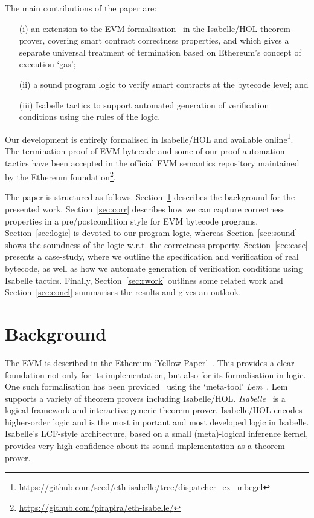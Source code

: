 \documentclass[sigplan,10pt,review]{acmart}\settopmatter{printfolios=true,printccs=false,printacmref=false}
\begin{document}
The main contributions of the paper are:
\begin{itemize}
\item[(i)] an extension to the EVM formalisation~\cite{Yoichi} in the Isabelle/HOL theorem prover,
           covering smart contract correctness properties, and which gives a separate universal
           treatment of termination based on Ethereum's concept of execution `gas';
\item[(ii)] a sound program logic to verify smart contracts at the bytecode level; and
\item[(iii)] Isabelle tactics to support automated generation of verification
            conditions using the rules of the logic.
\end{itemize}

Our development is entirely formalised in Isabelle/HOL and available online\footnote{\url{https://github.com/seed/eth-isabelle/tree/dispatcher_ex_mbegel}}.
The termination proof of EVM bytecode and some of our proof
automation tactics have been accepted in the official EVM
semantics repository maintained by the Ethereum foundation\footnote{\url{https://github.com/pirapira/eth-isabelle/}}.

The paper is structured as follows. Section~\ref{sec:bg} describes the background
for the presented work. Section~\ref{sec:corr} describes how we can capture correctness properties in a pre/postcondition
style for EVM bytecode programs. Section~\ref{sec:logic} is devoted to our program logic, 
whereas Section~\ref{sec:sound} shows the soundness of the logic
w.r.t. the correctness property.
Section~\ref{sec:case} presents a case-study, where we outline the
specification and verification of real bytecode, as well as how
we automate generation of verification conditions using Isabelle tactics.
Finally, Section~\ref{sec:rwork} outlines some related work and
Section~\ref{sec:concl} summarises the results and gives an outlook.
%
\section{Background} 
\label{sec:bg}
The EVM is described in the Ethereum `Yellow Paper'~\cite{wood2014ethereum}.
This provides a clear foundation not only for its implementation, but also for its formalisation in logic.
One such formalisation has been provided~\cite{Yoichi} using the `meta-tool' \emph{Lem}~\cite{DBLP:conf/icfp/MulliganOGRS14}.
Lem supports a variety of theorem provers including Isabelle/HOL.
\emph{Isabelle}~\cite{Nipkow_PW:Isabelle} is a logical framework and interactive generic theorem prover.
Isabelle/HOL encodes higher-order logic and is the most important and most developed logic in Isabelle.
Isabelle's LCF-style architecture,
based on a small (meta)-logical inference kernel, provides very high confidence about its sound
implementation as a theorem prover.
 
\end{document}
